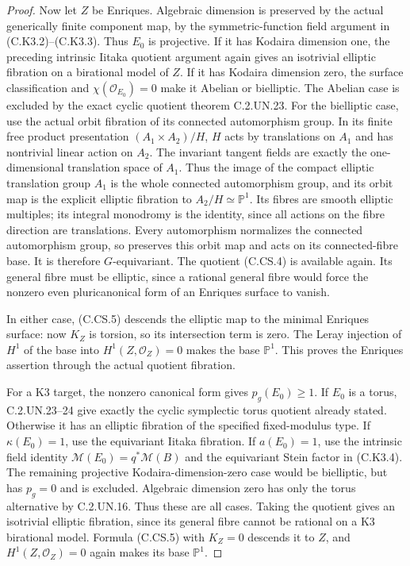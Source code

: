 \begin{proof}
Now let $Z$ be Enriques. Algebraic
dimension is preserved by the actual
generically finite component map, by
the symmetric-function field argument
in (C.K3.2)--(C.K3.3). Thus $E_0$ is
projective. If it has Kodaira dimension
one, the preceding intrinsic Iitaka
quotient argument again gives an
isotrivial elliptic fibration on a
birational model of $Z$. If it has
Kodaira dimension zero, the surface
classification and $\chi(\mathcal O_{E_0})=0$
make it Abelian or bielliptic.
The Abelian case is excluded by the
exact cyclic quotient theorem C.2.UN.23.
For the bielliptic case, use the actual
orbit fibration of its connected
automorphism group. In its finite free
product presentation $(A_1\times A_2)/H$,
$H$ acts by translations on $A_1$ and
has nontrivial linear action on $A_2$.
The invariant tangent fields are exactly
the one-dimensional translation space
of $A_1$. Thus the image of the compact
elliptic translation group $A_1$ is
the whole connected automorphism group,
and its orbit map is the explicit
elliptic fibration to $A_2/H\simeq\mathbb P^1$.
Its fibres are smooth elliptic multiples;
its integral monodromy is the identity,
since all actions on the fibre direction
are translations. Every automorphism
normalizes the connected automorphism
group, so preserves this orbit map and
acts on its connected-fibre base. It
is therefore $G$-equivariant. The quotient
(C.CS.4) is available again. Its
general fibre must be elliptic, since
a rational general fibre would force
the nonzero even pluricanonical form
of an Enriques surface to vanish.

In either case, (C.CS.5) descends the
elliptic map to the minimal Enriques
surface: now $K_Z$ is torsion, so its
intersection term is zero. The Leray
injection of $H^1$ of the base into
$H^1(Z,\mathcal O_Z)=0$ makes the
base $\mathbb P^1$. This proves the
Enriques assertion through the actual
quotient fibration.

For a K3 target, the nonzero canonical
form gives $p_g(E_0)\ge1$. If $E_0$
is a torus, C.2.UN.23--24 give exactly
the cyclic symplectic torus quotient
already stated. Otherwise it has an
elliptic fibration of the specified
fixed-modulus type. If $\kappa(E_0)=1$,
use the equivariant Iitaka fibration.
If $a(E_0)=1$, use the intrinsic
field identity $\mathcal M(E_0)=q^*\mathcal M(B)$
and the equivariant Stein factor in
(C.K3.4). The remaining projective
Kodaira-dimension-zero case would be
bielliptic, but has $p_g=0$ and is
excluded. Algebraic dimension zero
has only the torus alternative by
C.2.UN.16. Thus these are all cases.
Taking the quotient gives an isotrivial
elliptic fibration, since its general
fibre cannot be rational on a K3
birational model. Formula (C.CS.5)
with $K_Z=0$ descends it to $Z$,
and $H^1(Z,\mathcal O_Z)=0$ again
makes its base $\mathbb P^1$.


\end{proof}
